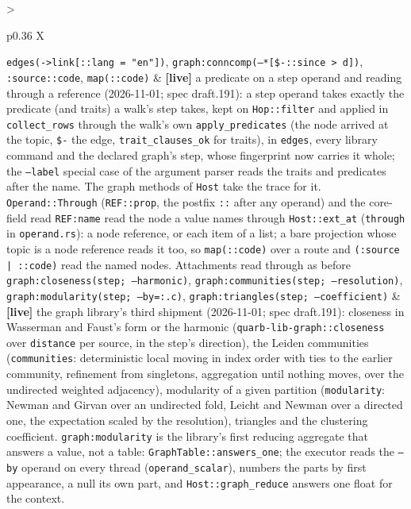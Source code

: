 \documentclass{report}
\newcommand{\live}{\textbf{\textcolor{blue!60!black}{[live]}}\xspace}
\begin{document}
\begin{xltabular}{\textwidth}{>{\raggedright\arraybackslash}p{0.36\textwidth} X}
\texttt{edges(->link[::lang = "en"])}, \texttt{graph:conncomp(--*[\$-::since > d])}, \texttt{:source::code}, \texttt{map(::code)}
  & \live a predicate on a step operand and reading through a
    reference (2026-11-01; spec draft.191): a step operand takes
    exactly the predicate (and traits) a walk's step takes, kept on
    \texttt{Hop::filter} and applied in \texttt{collect\_rows} through
    the walk's own \texttt{apply\_predicates} (the node arrived at
    the topic, \texttt{\$-} the edge, \texttt{trait\_clauses\_ok} for
    traits), in \texttt{edges}, every library command and the
    declared graph's step, whose fingerprint now carries it whole; the
    \texttt{--label} special case of the argument parser reads the
    traits and predicates after the name. The graph methods of
    \texttt{Host} take the trace for it. \texttt{Operand::Through}
    (\texttt{REF::prop}, the postfix \texttt{::} after any operand)
    and the core-field read \texttt{REF:name} read the node a value
    names through \texttt{Host::ext\_at} (\texttt{through} in
    \texttt{operand.rs}): a node reference, or each item of a list;
    a bare projection whose topic is a node reference reads it too,
    so \texttt{map(::code)} over a route and \texttt{(:source |
    ::code)} read the named nodes. Attachments read through as before \\
\texttt{graph:closeness(step; --harmonic)}, \texttt{graph:communities(step; --resolution)}, \texttt{graph:modularity(step; --by=:.c)}, \texttt{graph:triangles(step; --coefficient)}
  & \live the graph library's third shipment (2026-11-01; spec
    draft.191): closeness in Wasserman and Faust's form or the
    harmonic (\texttt{quarb-lib-graph::closeness} over
    \texttt{distance} per source, in the step's direction), the
    Leiden communities (\texttt{communities}: deterministic local
    moving in index order with ties to the earlier community,
    refinement from singletons, aggregation until nothing moves,
    over the undirected weighted adjacency), modularity of a given
    partition (\texttt{modularity}: Newman and Girvan over an
    undirected fold, Leicht and Newman over a directed one, the
    expectation scaled by the resolution), triangles and the
    clustering coefficient. \texttt{graph:modularity} is the
    library's first reducing aggregate that answers a value, not a
    table: \texttt{GraphTable::answers\_one}; the executor reads the
    \texttt{--by} operand on every thread (\texttt{operand\_scalar}),
    numbers the parts by first appearance, a null its own part, and
    \texttt{Host::graph\_reduce} answers one float for the context.

\end{xltabular}
\end{document}
